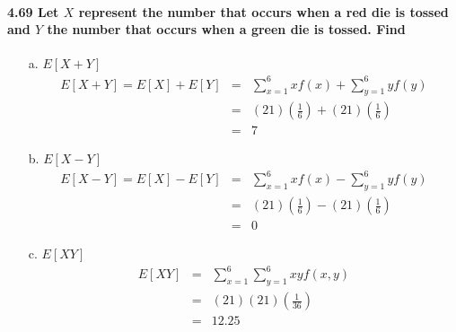 \documentclass{article}
\begin{document}
\paragraph{4.69 Let $X$ represent the number that occurs when a red die is 
tossed and $Y$ the number that occurs when a green die is tossed. Find}
\begin{enumerate}
\item[a.] $E[X+Y]$
\begin{eqnarray*}
E[X+Y] = E[X]+E[Y] & = & \sum_{x=1}^6 xf(x)+\sum_{y=1}^6 yf(y)\\
	& = & (21)\left(\frac{1}{6}\right)+(21)\left(\frac{1}{6}\right)\\
	& = & \boxed{7}
\end{eqnarray*}

\item[b.] $E[X-Y]$
\begin{eqnarray*}
E[X-Y] = E[X]-E[Y] & = & \sum_{x=1}^6 xf(x)-\sum_{y=1}^6 yf(y)\\
	& = & (21)\left(\frac{1}{6}\right)-(21)\left(\frac{1}{6}\right)\\
	& = & \boxed{0}
\end{eqnarray*}
	
\item[c.] $E[XY]$
\begin{eqnarray*}
E[XY] & = & \sum_{x=1}^6\sum_{y=1}^6 xyf(x,y)\\
	& = & (21)(21)\left(\frac{1}{36}\right)\\
	& = & \boxed{12.25}
\end{eqnarray*}

\end{enumerate}

\end{document}
